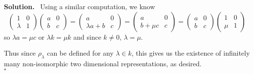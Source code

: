 \documentclass[12pt]{article}
\newenvironment{sol}{\noindent \textbf{Solution.} \,}{\\\hspace*{\fill}$\square$\medskip}
\begin{document}
\begin{sol}
	Using a similar computation, we know
	\[\begin{pmatrix}1&0\\\lambda&1\end{pmatrix}
	\begin{pmatrix}a&0\\b&c\end{pmatrix}
	=\begin{pmatrix}a&0\\\lambda a+b&c\end{pmatrix}
	=\begin{pmatrix}a&0\\b+\mu c&c\end{pmatrix}
	=\begin{pmatrix}a&0\\b&c\end{pmatrix}
	\begin{pmatrix}1&0\\\mu&1\end{pmatrix}\]
	so $\lambda a=\mu c$ or $\lambda k=\mu k$ and since $k\ne 0$, $\lambda=\mu.$
	
	Thus since $\rho_\lambda$ can be defined for any $\lambda\in k$, this gives us the existence of infinitely many non-isomorphic two dimensional representations, as desired.
\end{sol}
\end{document}

